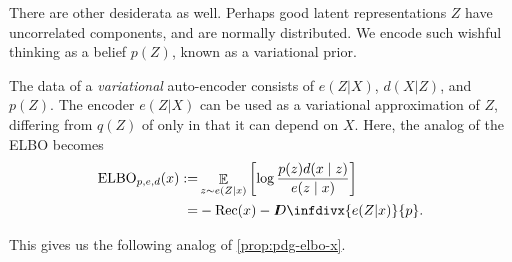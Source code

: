 \documentclass[twoside]{article}
\theoremstyle{plain}
\theoremstyle{definition}
\DeclareMathOperator*{\Ex}{\mathbb{E}} %
\newcommand{\thickD}{I\mkern-8muD}
\newcommand{\kldiv}{\thickD\infdivx}
\begin{document}
There are other desiderata as well. Perhaps good latent representations $Z$ have uncorrelated components, and are normally distributed. 
We encode such wishful thinking as a belief $p(Z)$, known as a variational prior.

The data of a \emph{variational} auto-encoder
\parencite{kingma2013autoencoding}
consists of $e(Z|X)$, $d(X|Z)$, and $p(Z)$.
The encoder $e(Z|X)$ can be used as a variational approximation of $Z$, differing from $q(Z)$ of  only in that it can depend on $X$. Here, the analog of the ELBO becomes
\vspace{-0.5ex}
\begin{align*}
	\mathrm{ELBO}_{p,e,d}(x) :=&
		\Ex_{z \sim e(Z|x)} \left[\log \frac{p(z) d(x\mid z)}{e(z\mid x)} \right] \\
		=& - \mathrm{Rec}(x) - \kldiv{e(Z|x)}{p}.
\end{align*}
\vspace{-3ex}

This gives us the following analog of \cref{prop:pdg-elbo-x}.
\end{document}
